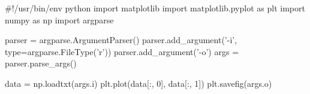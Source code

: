 #!/usr/bin/env python
import matplotlib
import matplotlib.pyplot as plt
import numpy as np
import argparse

parser = argparse.ArgumentParser()
parser.add_argument('-i', type=argparse.FileType('r'))
parser.add_argument('-o')
args = parser.parse_args()

data = np.loadtxt(args.i)
plt.plot(data[:, 0], data[:, 1])
plt.savefig(args.o)